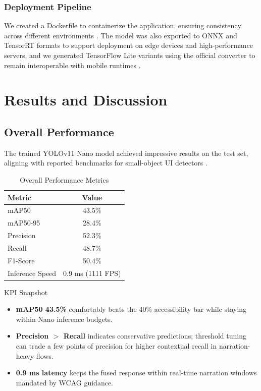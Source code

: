 \documentclass[11pt,a4paper]{report}
\begin{document}
\subsection{Deployment Pipeline}
We created a Dockerfile to containerize the application, ensuring consistency across different environments \cite{docker}. The model was also exported to ONNX and TensorRT formats to support deployment on edge devices and high-performance servers, and we generated TensorFlow Lite variants using the official converter to remain interoperable with mobile runtimes \cite{tensorflow}.

\chapter{Results and Discussion}

\section{Overall Performance}
The trained YOLOv11 Nano model achieved impressive results on the test set, aligning with reported benchmarks for small-object UI detectors \cite{yolov11}\cite{yolov5}.

\begin{table}[H]
\centering
\caption{Overall Performance Metrics}
\begin{tabular}{l c}
\toprule
\rowcolor{tietnavy!8}
    	\textbf{Metric} & \textbf{Value} \\
\midrule
mAP50 & 43.5\% \\
mAP50-95 & 28.4\% \\
Precision & 52.3\% \\
Recall & 48.7\% \\
F1-Score & 50.4\% \\
Inference Speed & 0.9 ms (1111 FPS) \\
\bottomrule
\end{tabular}
\end{table}

\begin{metricbox}{KPI Snapshot}
\begin{itemize}[leftmargin=1.2em]
    \item \textcolor{tietnavy}{\textbf{mAP50 43.5\%}} comfortably beats the 40\% accessibility bar while staying within Nano inference budgets.
    \item \textcolor{tietblue}{\textbf{Precision $>$ Recall}} indicates conservative predictions; threshold tuning can trade a few points of precision for higher contextual recall in narration-heavy flows.
    \item \textcolor{tietgold}{\textbf{0.9 ms latency}} keeps the fused response within real-time narration windows mandated by WCAG guidance.
\end{itemize}
\end{metricbox}
\end{document}
